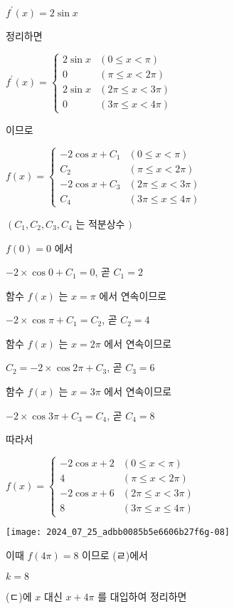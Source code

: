 \documentclass[10pt]{article}
\begin{document}
$f^{\prime}(x)=2 \sin x$

정리하면

$f^{\prime}(x)= \begin{cases}2 \sin x & (0 \leq x<\pi) \\ 0 & (\pi \leq x<2 \pi) \\ 2 \sin x & (2 \pi \leq x<3 \pi) \\ 0 & (3 \pi \leq x<4 \pi)\end{cases}$

이므로

$f(x)= \begin{cases}-2 \cos x+C_{1} & (0 \leq x<\pi) \\ C_{2} & (\pi \leq x<2 \pi) \\ -2 \cos x+C_{3} & (2 \pi \leq x<3 \pi) \\ C_{4} & (3 \pi \leq x \leq 4 \pi)\end{cases}$

$\left(C_{1}, C_{2}, C_{3}, C_{4}\right.$ 는 적분상수 $)$

$f(0)=0$ 에서

$-2 \times \cos 0+C_{1}=0$, 곧 $C_{1}=2$

함수 $f(x)$ 는 $x=\pi$ 에서 연속이므로

$-2 \times \cos \pi+C_{1}=C_{2}$, 곧 $C_{2}=4$

함수 $f(x)$ 는 $x=2 \pi$ 에서 연속이므로

$C_{2}=-2 \times \cos 2 \pi+C_{3}$, 곧 $C_{3}=6$

함수 $f(x)$ 는 $x=3 \pi$ 에서 연속이므로

$-2 \times \cos 3 \pi+C_{3}=C_{4}$, 곧 $C_{4}=8$

따라서

$f(x)= \begin{cases}-2 \cos x+2 & (0 \leq x<\pi) \\ 4 & (\pi \leq x<2 \pi) \\ -2 \cos x+6 & (2 \pi \leq x<3 \pi) \\ 8 & (3 \pi \leq x \leq 4 \pi)\end{cases}$

\begin{center}
\texttt{[image: 2024\_07\_25\_adbb0085b5e6606b27f6g-08]}
\end{center}

이때 $f(4 \pi)=8$ 이므로 (ㄹ)에서

$k=8$

(ㄷ)에 $x$ 대신 $x+4 \pi$ 를 대입하여 정리하면
\end{document}
